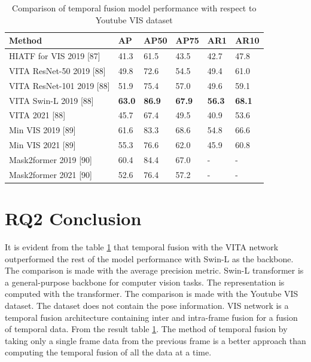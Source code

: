     \begin{table}[h]
    	\begin{center}
    		\begin{tabular}{ | l | l| l| l| l| p{2cm} |}
    			\hline
    			
    			\cellcolor{purple!30}Method & \cellcolor{purple!30}AP & \cellcolor{purple!30}AP50 & \cellcolor{purple!30}AP75 & \cellcolor{purple!30}AR1 & \cellcolor{purple!30}AR10 \\ \hline
    			HIATF for VIS 2019 [87] & 41.3 & 61.5 & 43.5 & 42.7 & 47.8 \\ \hline
    			VITA ResNet-50 2019 [88]  & 49.8 & 72.6 & 54.5 & 49.4 & 61.0  \\ \hline
    			VITA ResNet-101 2019 [88]  & 51.9 & 75.4 & 57.0 & 49.6 & 59.1 \\ \hline
    			VITA Swin-L 2019 [88]  & { \bf 63.0}  & { \bf 86.9} & { \bf 67.9} & { \bf 56.3} & { \bf 68.1} \\ \hline
    			VITA 2021 [88]  & 45.7 & 67.4 & 49.5 & 40.9 & 53.6 \\ \hline
    			Min VIS 2019 [89] & 61.6 & 83.3 & 68.6 & 54.8 & 66.6 \\ \hline
    			Min VIS 2021 [89] & 55.3 & 76.6 & 62.0 & 45.9 & 60.8 \\ \hline
    			Mask2former 2019 [90]  & 60.4 & 84.4 & 67.0 & - & - \\ \hline
    			Mask2former 2021 [90]  & 52.6 & 76.4 & 57.2 & - & - \\ \hline
    			\hline
    		\end{tabular}
    		\caption{Comparison of temporal fusion model performance with respect to Youtube VIS dataset}
    		\label{tab:sota_ytube_vis}
    	\end{center}
    \end{table}
    
    \section{RQ2 Conclusion}
    
    It is evident from the table \ref{tab:sota_ytube_vis} that temporal fusion with the VITA network outperformed the rest of the model performance with Swin-L as the backbone. The comparison is made with the average precision metric. Swin-L transformer is a general-purpose backbone for computer vision tasks. The representation is computed with the transformer. The comparison is made with the Youtube VIS dataset. The dataset does not contain the pose information. VIS network is a temporal fusion architecture containing inter and intra-frame fusion for a fusion of temporal data. From the result table \ref{tab:sota_ytube_vis}. The method of temporal fusion by taking only a single frame data from the previous frame is a better approach than computing the temporal fusion of all the data at a time.
    
